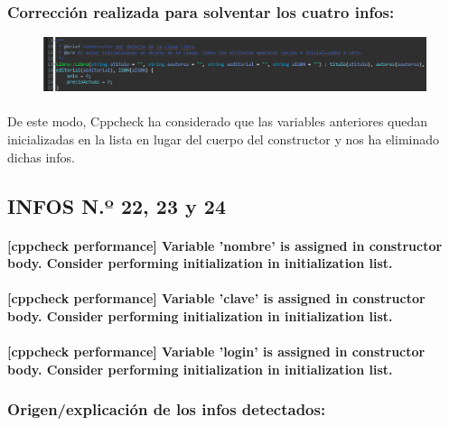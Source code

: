 		\subsubsection{Corrección realizada para solventar los cuatro infos:}
		
			\begin{figure}[H]
				\centering
				\includegraphics[scale=0.55]{img/esteban27.png}
				\label{esteban27}
			\end{figure}
		
			\paragraph{}De este modo, Cppcheck ha considerado que las variables anteriores quedan inicializadas en la lista en lugar del cuerpo del constructor y nos ha eliminado dichas infos.
			
	\subsection{INFOS N.º 22, 23 y 24}
	
		\paragraph{[cppcheck performance] Variable 'nombre' is assigned in constructor body. Consider performing initialization in initialization list.}
		
		\paragraph{[cppcheck performance] Variable 'clave' is assigned in constructor body. Consider performing initialization in initialization list.}
		
		\paragraph{[cppcheck performance] Variable 'login' is assigned in constructor body. Consider performing initialization in initialization list.}
	
		\subsubsection{Origen/explicación de los infos detectados:}
		
